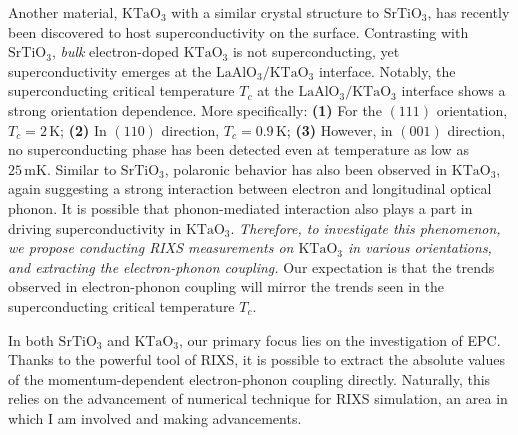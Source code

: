\documentclass[11pt]{article}
\begin{document}
Another material, $\mathrm{KTaO_{3}}$ with a similar crystal structure to $\mathrm{SrTiO_{3}}$, has recently been discovered to host superconductivity on the surface\cite{ren_two-dimensional_2022}. 
Contrasting with $\mathrm{SrTiO_{3}}$, \textit{bulk}  electron-doped $\mathrm{KTaO_{3}}$ is not superconducting, yet superconductivity emerges at the $\mathrm{LaAlO_{3}/KTaO_{3}}$ interface\cite{ren_two-dimensional_2022,chen_two-dimensional_2021}. 
Notably, the superconducting critical temperature $T_c$ at the $\mathrm{LaAlO_{3}/KTaO_{3}}$ interface shows a strong orientation dependence\cite{ren_two-dimensional_2022,chen_two-dimensional_2021}. 
More specifically: 
\textbf{(1)} For the $(111)$ orientation, $T_{c} = 2\,\mathrm{K}$\cite{ren_two-dimensional_2022};
\textbf{(2)} In $(110)$ direction, $T_{c} = 0.9\,\mathrm{K}$\cite{chen_two-dimensional_2021};
\textbf{(3)} However, in $(001)$ direction, no superconducting phase has been detected even at temperature as low as $25\,\mathrm{mK}$\cite{ren_two-dimensional_2022}. 
Similar to $\mathrm{SrTiO_{3}}$\cite{swartz_polaronic_2018}, polaronic behavior has also been observed in $\mathrm{KTaO_{3}}$, again suggesting a strong interaction between electron and longitudinal optical phonon\cite{chen_orientation-dependent_2023}. 
It is possible that phonon-mediated interaction also plays a part in driving superconductivity in $\mathrm{KTaO_{3}}$. 
\textit{Therefore, to investigate this phenomenon, we propose conducting RIXS measurements on $\mathrm{KTaO_{3}}$ in various orientations, and extracting the electron-phonon coupling.}
Our expectation is that the trends observed in electron-phonon coupling will mirror the trends seen in the superconducting critical temperature $T_c$. 

In both $\mathrm{SrTiO_{3}}$ and $\mathrm{KTaO_{3}}$, our primary focus lies on the investigation of EPC. 
Thanks to the powerful tool of RIXS, it is possible to extract the absolute values of the momentum-dependent electron-phonon coupling directly. 
Naturally, this relies on the advancement of numerical technique for RIXS simulation, an area in which I am involved and making advancements.
\end{document}
